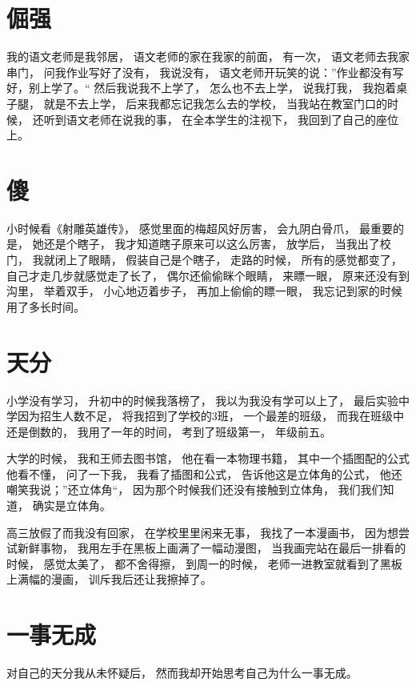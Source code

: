 \section{倔强}

我的语文老师是我邻居，
语文老师的家在我家的前面，
有一次，
语文老师去我家串门，
问我作业写好了没有，
我说没有，
语文老师开玩笑的说：”作业都没有写好，别上学了。“
然后我说我不上学了，
怎么也不去上学，
说我打我，
我抱着桌子腿，
就是不去上学，
后来我都忘记我怎么去的学校，
当我站在教室门口的时候，
还听到语文老师在说我的事，
在全本学生的注视下，
我回到了自己的座位上。


\section{傻}

小时候看《射雕英雄传》，
感觉里面的梅超风好厉害，
会九阴白骨爪，
最重要的是，
她还是个瞎子，
我才知道瞎子原来可以这么厉害，
放学后，
当我出了校门，
我就闭上了眼睛，
假装自己是个瞎子，
走路的时候，
所有的感觉都变了，
自己才走几步就感觉走了长了，
偶尔还偷偷眯个眼睛，
来瞟一眼，
原来还没有到沟里，
举着双手，
小心地迈着步子，
再加上偷偷的瞟一眼，
我忘记到家的时候用了多长时间。


\section{天分}

小学没有学习，
升初中的时候我落榜了，
我以为我没有学可以上了，
最后实验中学因为招生人数不足，
将我招到了学校的3班，
一个最差的班级，
而我在班级中还是倒数的，
我用了一年的时间，
考到了班级第一，
年级前五。

大学的时候，
我和王师去图书馆，
他在看一本物理书籍，
其中一个插图配的公式他看不懂，
问了一下我，
我看了插图和公式，
告诉他这是立体角的公式，
他还嘲笑我说；”还立体角“，
因为那个时候我们还没有接触到立体角，
我们我们知道，
确实是立体角。


高三放假了而我没有回家，
在学校里里闲来无事，
我找了一本漫画书，
因为想尝试新鲜事物，
我用左手在黑板上画满了一幅动漫图，
当我画完站在最后一排看的时候，
感觉太美了，
都不舍得擦，
到周一的时候，
老师一进教室就看到了黑板上满幅的漫画，
训斥我后还让我擦掉了。




\section{一事无成}

对自己的天分我从未怀疑后，
然而我却开始思考自己为什么一事无成。


